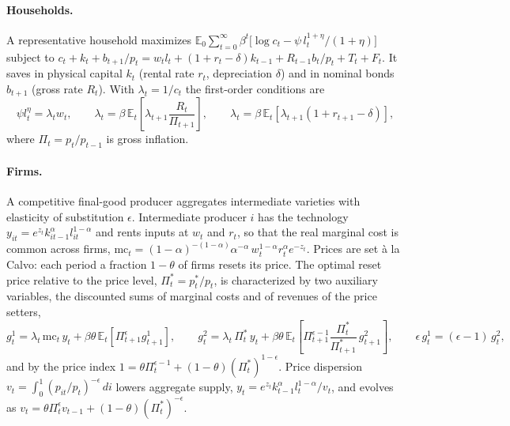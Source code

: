 \documentclass[11pt]{article}
\newcommand{\E}{\mathbb{E}}
\begin{document}
\paragraph{Households.} A representative household maximizes
$\E_0 \sum_{t=0}^{\infty} \beta^t \big[ \log c_t - \psi\, l_t^{1+\eta}/(1+\eta) \big]$
subject to $c_t + k_t + b_{t+1}/p_t = w_t l_t + (1 + r_t - \delta) k_{t-1} + R_{t-1} b_t/p_t + T_t + F_t$. It saves in physical capital $k_t$ (rental rate $r_t$, depreciation $\delta$) and in nominal bonds $b_{t+1}$ (gross rate $R_t$). With $\lambda_t = 1/c_t$ the first-order conditions are
\begin{equation}
\psi l_t^{\eta} = \lambda_t w_t, \qquad
\lambda_t = \beta\, \E_t\!\left[ \lambda_{t+1} \frac{R_t}{\Pi_{t+1}} \right], \qquad
\lambda_t = \beta\, \E_t\!\left[ \lambda_{t+1} (1 + r_{t+1} - \delta) \right],
\label{eq:hh}
\end{equation}
where $\Pi_t = p_t/p_{t-1}$ is gross inflation.

\paragraph{Firms.} A competitive final-good producer aggregates intermediate varieties with elasticity of substitution $\epsilon$. Intermediate producer $i$ has the technology $y_{it} = e^{z_t} k_{it-1}^{\alpha} l_{it}^{1-\alpha}$ and rents inputs at $w_t$ and $r_t$, so that the real marginal cost is common across firms, $\mathrm{mc}_t = (1-\alpha)^{-(1-\alpha)} \alpha^{-\alpha}\, w_t^{1-\alpha} r_t^{\alpha} e^{-z_t}$. Prices are set \`a la Calvo: each period a fraction $1-\theta$ of firms resets its price. The optimal reset price relative to the price level, $\Pi_t^* = p_t^*/p_t$, is characterized by two auxiliary variables, the discounted sums of marginal costs and of revenues of the price setters,
\begin{equation}
g^1_t = \lambda_t\, \mathrm{mc}_t\, y_t + \beta\theta\, \E_t\!\left[ \Pi_{t+1}^{\epsilon} g^1_{t+1} \right], \qquad
g^2_t = \lambda_t\, \Pi^*_t\, y_t + \beta\theta\, \E_t\!\left[ \Pi_{t+1}^{\epsilon-1} \frac{\Pi^*_t}{\Pi^*_{t+1}}\, g^2_{t+1} \right], \qquad
\epsilon\, g^1_t = (\epsilon - 1)\, g^2_t,
\label{eq:calvo}
\end{equation}
and by the price index $1 = \theta \Pi_t^{\epsilon-1} + (1-\theta) (\Pi^*_t)^{1-\epsilon}$. Price dispersion $v_t = \int_0^1 (p_{it}/p_t)^{-\epsilon}\, di$ lowers aggregate supply, $y_t = e^{z_t} k_{t-1}^{\alpha} l_t^{1-\alpha} / v_t$, and evolves as $v_t = \theta \Pi_t^{\epsilon} v_{t-1} + (1-\theta) (\Pi^*_t)^{-\epsilon}$.
\end{document}
